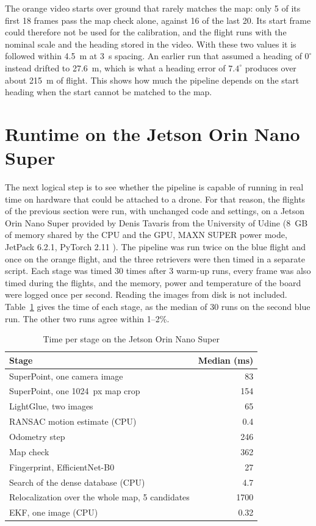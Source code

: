 \documentclass[english, Lau, oneside]{sapthesis}%
\begin{document}
The orange video starts over ground that rarely matches the map: only 5 of its first 18 frames pass the map check alone, against 16 of the last 20. Its start frame could therefore not be used for the calibration, and the flight runs with the nominal scale and the heading stored in the video. With these two values it is followed within 4.5~m at 3~s spacing. An earlier run that assumed a heading of $0^\circ$ instead drifted to 27.6~m, which is what a heading error of $7.4^\circ$ produces over about 215~m of flight. This shows how much the pipeline depends on the start heading when the start cannot be matched to the map.

\section{Runtime on the Jetson Orin Nano Super}
\label{sec:jetson-runtime}
The next logical step is to see whether the pipeline is capable of running in real time on hardware that could be attached to a drone. For that reason, the flights of the previous section were run, with unchanged code and settings, on a Jetson Orin Nano Super provided by Denis Tavaris from the University of Udine (8~GB of memory shared by the CPU and the GPU, MAXN SUPER power mode, JetPack 6.2.1, PyTorch 2.11 \citep{paszke2019pytorch}). The pipeline was run twice on the blue flight and once on the orange flight, and the three retrievers were then timed in a separate script. Each stage was timed 30 times after 3 warm-up runs, every frame was also timed during the flights, and the memory, power and temperature of the board were logged once per second. Reading the images from disk is not included. Table~\ref{tab:jetson-stages} gives the time of each stage, as the median of 30 runs on the second blue run. The other two runs agree within 1--2\%.

\begin{table}[!htbp]
  \centering
  \caption{Time per stage on the Jetson Orin Nano Super}
  \label{tab:jetson-stages}
  \small
  \begin{tabular}{lr}
    \toprule
    Stage & Median (ms) \\
    \midrule
    SuperPoint, one camera image & 83 \\
    SuperPoint, one 1024~px map crop & 154 \\
    LightGlue, two images & 65 \\
    RANSAC motion estimate (CPU) & 0.4 \\
    Odometry step & 246 \\
    Map check & 362 \\
    Fingerprint, EfficientNet-B0 & 27 \\
    Search of the dense database (CPU) & 4.7 \\
    Relocalization over the whole map, 5 candidates & 1700 \\
    EKF, one image (CPU) & 0.32 \\
    \bottomrule
  \end{tabular}
\end{table}
\end{document}

